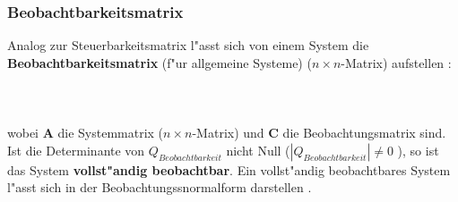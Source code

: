 {\subsubsection{Beobachtbarkeitsmatrix}
Analog zur Steuerbarkeitsmatrix l"asst sich von einem System die {\bf Beobachtbarkeitsmatrix} (f"ur allgemeine Systeme) ($n\times n$-Matrix) aufstellen \cite{GIR:RAB:STE:05, LUT:WEN:05, UNB:89}:\\~\\
\\~\\
\nit wobei $ \boldsymbol{A} $ die Systemmatrix ($n\times n$-Matrix) und $ \boldsymbol{C}$ die Beobachtungsmatrix sind. Ist die
Determinante von $Q_{Beobachtbarkeit}$ nicht Null ($\left | Q_{Beobachtbarkeit}\right| \neq 0$ ), so ist das System {\bf vollst"andig beobachtbar}. Ein vollst"andig beobachtbares System l"asst sich in der Beobachtungssnormalform  darstellen \cite{LUT:WEN:05}.

}
